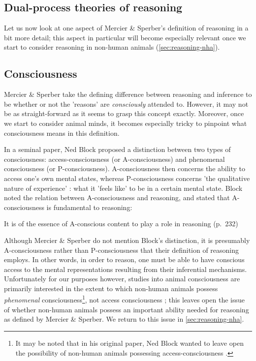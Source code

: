 \subsection{Dual-process theories of reasoning}

Let us now look at one aspect of Mercier \& Sperber's definition of reasoning in a bit more detail; this aspect in particular will become especially relevant once we start to consider reasoning in non-human animals (\cref{sec:reasoning-nha}).

\subsection{Consciousness}

Mercier \& Sperber take the defining difference between reasoning and inference to be whether or not the 'reasons' are \emph{consciously} attended to. However, it may not be as straight-forward as it seems to grasp this concept exactly. Moreover, once we start to consider animal minds, it becomes especially tricky to pinpoint what consciousness means in this definition.

In a seminal \citeyear{Block95} paper, Ned Block proposed a distinction between two types of consciousness: access-consciousness (or A-consciousness) and phenomenal consciousness (or P-consciousness). A-consciousness then concerns the ability to access one's own mental states, whereas P-consciousness concerns 'the qualitative nature of experience' \citep[p.~52]{Andrews15}: what it 'feels like' to be in a certain mental state. 
Block noted the relation between A-consciousness and reasoning, and stated that A-consciousness is fundamental to reasoning:
\begin{quoting}
    It is of the essence of A-conscious content to play a role in reasoning
\hfill (p.~232)
\end{quoting}
Although Mercier \& Sperber do not mention Block's distinction, it is presumably A-consciousness rather than P-consciousness that their definition of reasoning employs. In other words, in order to reason, one must be able to have conscious access to the mental representations resulting from their inferential mechanisms.
Unfortunately for our purposes however, studies into animal consciousness are primarily interested in the extent to which non-human animals possess \emph{phenomenal} consciousness\footnote{It may be noted that in his original paper, Ned Block wanted to leave open the possibility of non-human animals possessing access-consciousness \citep{Block95}.}, not access consciousness \citep{Andrews15, Carruthers18}; this leaves open the issue of whether non-human animals possess an important ability needed for reasoning as defined by Mercier \& Sperber.
We return to this issue in \cref{sec:reasoning-nha}.

